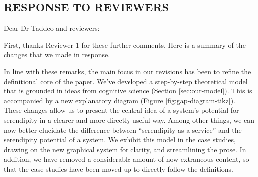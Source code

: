 


\subsection*{RESPONSE TO REVIEWERS}

Dear Dr Taddeo and reviewers:

First, thanks Reviewer 1 for these further comments.  Here is a
summary of the changes that we made in response.

\bigskip


In line with these remarks, the main focus in our revisions has been
to refine the definitional core of the paper.  We've developed a
step-by-step theoretical model that is grounded in ideas from
cognitive science (Section \ref{sec:our-model}).  This is accompanied
by a new explanatory diagram (Figure \ref{fig:gap-diagram-tikz}).
These changes allow us to present the central idea of a system's
potential for serendipity in a clearer and more directly useful way.
Among other things, we can now better elucidate the difference between
``serendipity as a service'' and the serendipity potential of a
system.  We exhibit this model in the case studies, drawing on the new
graphical system for clarity, and streamlining the prose.
In addition, we have removed a considerable amount of now-extraneous
content, so that the case studies have been moved up to directly
follow the definitions.


